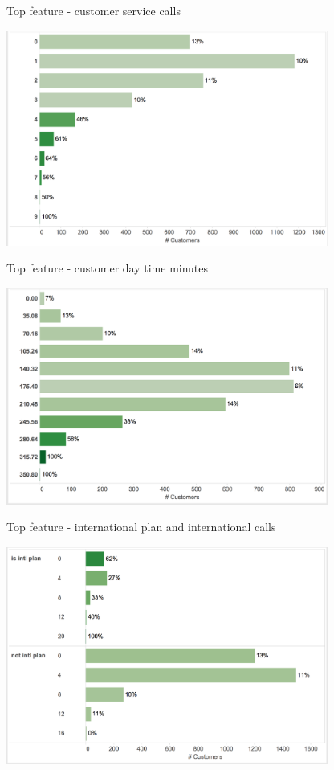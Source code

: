 \documentclass[10pt]{beamer}
\begin{document}
    \begin{frame}{Top feature - customer service calls}
      \begin{center}
        \includegraphics[width=300pt]{../graphs/top_var_cust_surv}
      \end{center}
    \end{frame}

    \begin{frame}{Top feature - customer day time minutes}
      \begin{center}
        \includegraphics[width=300pt]{../graphs/top_var_day_mins}
      \end{center}
    \end{frame}

    \begin{frame}{Top feature - international plan and international calls}
      \begin{center}
        \includegraphics[width=300pt]{../graphs/top_var_intl_plan_calls}
      \end{center}
    \end{frame}
\end{document}
